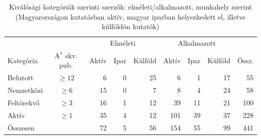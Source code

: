 \begin{table}[h]
  \centering
  \caption{Kiválósági kategóriák szerinti szerzők: elméleti/alkalmazott, munkahely szerint (Magyarországon kutatásban aktív, magyar iparban helyezkedett el, illetve külföldön kutatók)}
  \label{tab:excellence_summary}
  \begin{tabular}{lc|rrr|rrr|r}
    \hline
     & & \multicolumn{3}{c|}{Elméleti} & \multicolumn{3}{c|}{Alkalmazott} & \\
    Kategória &A$^*$ ekv. pub. & Aktív & Ipar & Külföld & Aktív & Ipar & Külföld & Össz. \\
    \hline
    Befutott & $\geq12$ & 6 & 0 & 25 & 6 & 1 & 17 & 55 \\
    Nemzetközi & $\geq6$ & 15 & 0 & 7 & 8 & 4 & 24 & 58 \\
    Feltörekvő & $\geq3$ & 16 & 1 & 12 & 39 & 11 & 21 & 100 \\
    Aktív & $\geq1$ & 35 & 4 & 12 & 101 & 39 & 37 & 228 \\
    \hline
    Összesen & &72 & 5 & 56 & 154 & 55 & 99 & 441 \\
    \hline
  \end{tabular}
\end{table}
